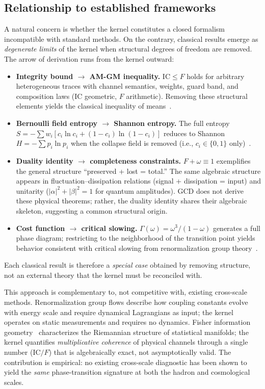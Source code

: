 \documentclass[11pt]{article}
\newcommand{\IC}{\mathrm{IC}}
\begin{document}
\subsection{Relationship to established frameworks}

A natural concern is whether the kernel constitutes a closed
formalism incompatible with standard methods. On the contrary,
classical results emerge as \emph{degenerate limits} of the
kernel when structural degrees of freedom are removed. The arrow
of derivation runs from the kernel outward:

\begin{itemize}[leftmargin=1.5em,itemsep=1pt]
\item \textbf{Integrity bound $\to$ AM-GM inequality.}
  $\IC \leq F$ holds for arbitrary heterogeneous traces with
  channel semantics, weights, guard band, and composition laws
  ($\IC$ geometric, $F$ arithmetic). Removing these structural
  elements yields the classical inequality of
  means~\cite{hardylittlewoodpolya1952}.
\item \textbf{Bernoulli field entropy $\to$ Shannon entropy.}
  The full entropy $S = -\sum w_i[c_i \ln c_i + (1{-}c_i)\ln(1{-}c_i)]$
  reduces to Shannon $H = -\sum p_i \ln p_i$ when the collapse
  field is removed (i.e., $c_i \in \{0,1\}$
  only)~\cite{shannon1948}.
\item \textbf{Duality identity $\to$ completeness constraints.}
  $F + \omega \equiv 1$ exemplifies the general structure
  ``preserved + lost = total.'' The same algebraic structure
  appears in fluctuation--dissipation relations (signal +
  dissipation = input) and unitarity ($|\alpha|^2 + |\beta|^2 = 1$
  for quantum amplitudes). GCD does not derive these physical
  theorems; rather, the duality identity shares their algebraic
  skeleton, suggesting a common structural origin.
\item \textbf{Cost function $\to$ critical slowing.}
  $\Gamma(\omega) = \omega^3/(1{-}\omega)$ generates a full phase
  diagram; restricting to the neighborhood of the transition
  point yields behavior consistent with critical slowing
  from renormalization group theory~\cite{gross1973}.
\end{itemize}

\noindent Each classical result is therefore a \emph{special case}
obtained by removing structure, not an external theory that the
kernel must be reconciled with.

This approach is complementary to, not competitive with, existing
cross-scale methods. Renormalization group flows describe how
coupling constants evolve with energy scale and require dynamical
Lagrangians as input; the kernel operates on static measurements
and requires no dynamics. Fisher information
geometry~\cite{amari2016information} characterizes the Riemannian
structure of statistical manifolds; the kernel quantifies
\emph{multiplicative coherence} of physical channels through a
single number ($\IC/F$) that is algebraically exact, not
asymptotically valid. The contribution is empirical: no
existing cross-scale diagnostic has been shown to yield the
\emph{same} phase-transition signature at both the hadron and
cosmological scales.
\end{document}
